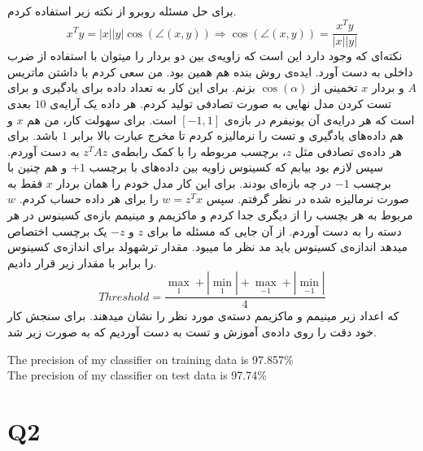 \documentclass[a4paper]{article}
\begin{document}
\subsection{}
برای حل مسئله روبرو از نکته زیر استفاده کردم. 
\begin{equation*}
	x^{T}y = |x| |y| \cos(\angle(x,y)) \Rightarrow \cos(\angle(x,y)) = \frac{x^{T}y}{|x| |y|}
\end{equation*}
نکته‌ای که وجود دارد این است که زاویه‌ی بین دو بردار را میتوان با استفاده از ضرب داخلی به دست آورد. ایده‌ی روش بنده هم همین بود. من سعی کردم با داشتن ماتریس $ A $ و بردار $ x $ تخمینی از
 $ \cos(\alpha) $
 بزنم. برای این کار به تعداد 
 داده برای یادگیری و 
 برای تست کردن مدل نهایی به صورت تصادفی تولید کردم. هر داده یک آرایه‌ی $ 10 $ بعدی است که هر درایه‌ی آن یونیفرم در بازه‌ی
  $ [-1,1] $ 
  است. برای سهولت کار، من هم $ x $ و هم داده‌های یادگیری و تست را نرمالیزه کردم تا مخرج عبارت بالا برابر $ 1 $ باشد. برای هر داده‌ی تصادفی مثل $ z $، برچسب مربوطه را با کمک رابطه‌ی
   $ z^{T}Az $
   به دست آوردم. سپس لازم بود بیابم که کسینوس زاویه بین داده‌های با برچسب $ +1 $ و هم چنین با برچسب $ -1 $ در چه بازه‌ای بودند. برای این کار مدل خودم را همان بردار $ x $ فقط به صورت نرمالیزه شده در نظر گرفتم. سپس
    $ w = z^{T}x $
    را برای هر داده‌ حساب کردم. $ w $ مربوط به هر بچسب را از دیگری جدا کردم و ماکزیمم و مینیمم بازه‌ی کسینوس در هر دسته را به دست آوردم. از آن جایی که مسئله ما برای 
    $ z $ 
   و
     $ -z $
 یک برچسب اختصاص میدهد اندازه‌ی کسینوس باید مد نظر ما میبود. مقدار ترشهولد برای  اندازه‌ی کسینوس را برابر با مقدار زیر قرار دادیم.
\begin{equation*}
 	Threshold = \frac{\max_{1} + |\min_{1}| + \max_{-1} + |\min_{-1}|}{4}
\end{equation*}
   که اعداد زیر مینیمم و ماکزیمم دسته‌ی مورد نظر را نشان میدهند. برای سنجش کار خود دقت را روی داده‌ی آموزش و تست به دست آوردیم که به صورت زیر شد.
\begin{center}
	   \begin{latin}
   	The precision of my classifier on training data is 97.857\%
   	\\
   	The precision of my classifier on test data is 97.74\%
   \end{latin}
\end{center}
\subsection{}
\newpage
\section{Q2}
\end{document}

